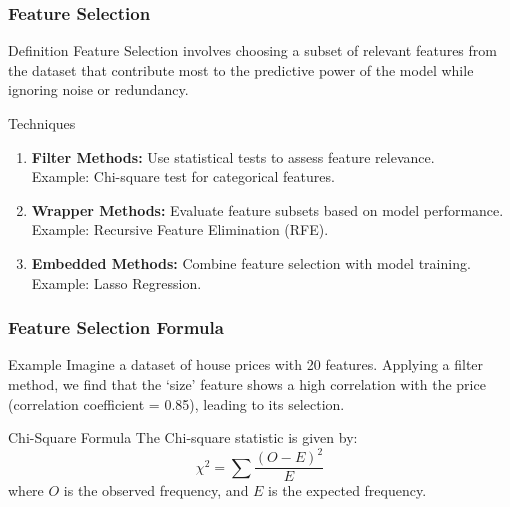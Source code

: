 \documentclass[aspectratio=169]{beamer}
\begin{document}
\begin{frame}[fragile]
    \frametitle{Feature Selection}
    \begin{block}{Definition}
        Feature Selection involves choosing a subset of relevant features from the dataset that contribute most 
        to the predictive power of the model while ignoring noise or redundancy.
    \end{block}

    \begin{block}{Techniques}
        \begin{enumerate}
            \item \textbf{Filter Methods:} Use statistical tests to assess feature relevance.\\
                  Example: Chi-square test for categorical features.
            \item \textbf{Wrapper Methods:} Evaluate feature subsets based on model performance.\\
                  Example: Recursive Feature Elimination (RFE).
            \item \textbf{Embedded Methods:} Combine feature selection with model training.\\
                  Example: Lasso Regression.
        \end{enumerate}
    \end{block}
\end{frame}

\begin{frame}[fragile]
    \frametitle{Feature Selection Formula}
    \begin{block}{Example}
        Imagine a dataset of house prices with 20 features. Applying a filter method, we find that the ‘size’ 
        feature shows a high correlation with the price (correlation coefficient = 0.85), leading to its selection.
    \end{block}
    
    \begin{block}{Chi-Square Formula}
        The Chi-square statistic is given by:
        \begin{equation}
            \chi^2 = \sum \frac{(O - E)^2}{E}
        \end{equation}
        where $O$ is the observed frequency, and $E$ is the expected frequency.
    \end{block}
\end{frame}
\end{document}
